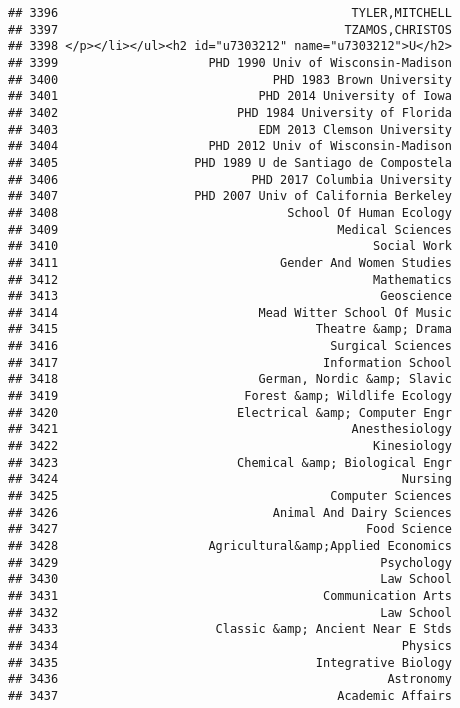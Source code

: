 \documentclass[
]{article}
\begin{document}
\begin{verbatim}
## 3396                                         TYLER,MITCHELL
## 3397                                        TZAMOS,CHRISTOS
## 3398 </p></li></ul><h2 id="u7303212" name="u7303212">U</h2>
## 3399                     PHD 1990 Univ of Wisconsin-Madison
## 3400                              PHD 1983 Brown University
## 3401                            PHD 2014 University of Iowa
## 3402                         PHD 1984 University of Florida
## 3403                            EDM 2013 Clemson University
## 3404                     PHD 2012 Univ of Wisconsin-Madison
## 3405                   PHD 1989 U de Santiago de Compostela
## 3406                           PHD 2017 Columbia University
## 3407                   PHD 2007 Univ of California Berkeley
## 3408                                School Of Human Ecology
## 3409                                       Medical Sciences
## 3410                                            Social Work
## 3411                               Gender And Women Studies
## 3412                                            Mathematics
## 3413                                             Geoscience
## 3414                            Mead Witter School Of Music
## 3415                                    Theatre &amp; Drama
## 3416                                      Surgical Sciences
## 3417                                     Information School
## 3418                            German, Nordic &amp; Slavic
## 3419                          Forest &amp; Wildlife Ecology
## 3420                         Electrical &amp; Computer Engr
## 3421                                         Anesthesiology
## 3422                                            Kinesiology
## 3423                         Chemical &amp; Biological Engr
## 3424                                                Nursing
## 3425                                      Computer Sciences
## 3426                              Animal And Dairy Sciences
## 3427                                           Food Science
## 3428                     Agricultural&amp;Applied Economics
## 3429                                             Psychology
## 3430                                             Law School
## 3431                                     Communication Arts
## 3432                                             Law School
## 3433                      Classic &amp; Ancient Near E Stds
## 3434                                                Physics
## 3435                                    Integrative Biology
## 3436                                              Astronomy
## 3437                                       Academic Affairs

\end{verbatim}
\end{document}
